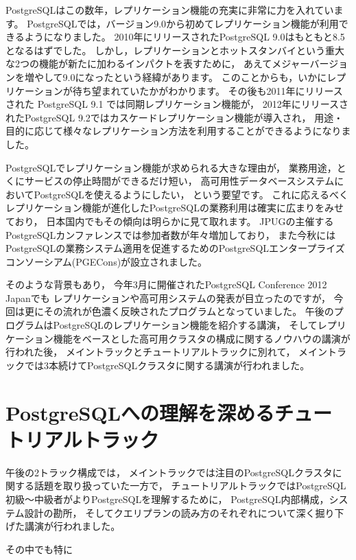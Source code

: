 PostgreSQLはこの数年，レプリケーション機能の充実に非常に力を入れています。
PostgreSQLでは，バージョン9.0から初めてレプリケーション機能が利用できるようになりました。
2010年にリリースされたPostgreSQL 9.0はもともと8.5となるはずでした。
しかし，レプリケーションとホットスタンバイという重大な2つの機能が新たに加わるインパクトを表すために，
あえてメジャーバージョンを増やして9.0になったという経緯があります。
このことからも，いかにレプリケーションが待ち望まれていたかがわかります。
その後も2011年にリリースされた PostgreSQL 9.1 では同期レプリケーション機能が，
2012年にリリースされたPostgreSQL 9.2ではカスケードレプリケーション機能が導入され，
用途・目的に応じて様々なレプリケーション方法を利用することができるようになりました。

PostgreSQLでレプリケーション機能が求められる大きな理由が，
業務用途，とくにサービスの停止時間ができるだけ短い，
高可用性データベースシステムにおいてPostgreSQLを使えるようにしたい，
という要望です。
これに応えるべくレプリケーション機能が進化したPostgreSQLの業務利用は確実に広まりをみせており，
日本国内でもその傾向は明らかに見て取れます。
JPUGの主催するPostgreSQLカンファレンスでは参加者数が年々増加しており，
また今秋にはPostgreSQLの業務システム適用を促進するためのPostgreSQLエンタープライズコンソーシアム(PGECons)が設立されました。

そのような背景もあり，
今年3月に開催されたPostgreSQL Conference 2012 Japanでも
レプリケーションや高可用システムの発表が目立ったのですが，
今回は更にその流れが色濃く反映されたプログラムとなっていました。
午後のプログラムはPostgreSQLのレプリケーション機能を紹介する講演，
そしてレプリケーション機能をベースとした高可用クラスタの構成に関するノウハウの講演が行われた後，
メイントラックとチュートリアルトラックに別れて，
メイントラックでは3本続けてPostgreSQLクラスタに関する講演が行われました。

\section{PostgreSQLへの理解を深めるチュートリアルトラック}

午後の2トラック構成では，
メイントラックでは注目のPostgreSQLクラスタに関する話題を取り扱っていた一方で，
チュートリアルトラックではPostgreSQL初級〜中級者がよりPostgreSQLを理解するために，
PostgreSQL内部構成，システム設計の勘所，
そしてクエリプランの読み方のそれぞれについて深く掘り下げた講演が行われました。

その中でも特に